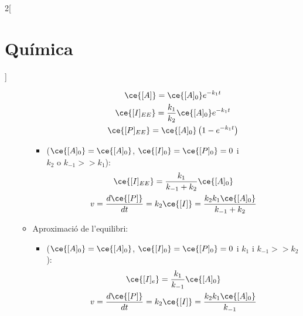 \documentclass[../../../main.tex]{subfiles}
\begin{document}
\begin{multicols}{2}[\section{Química}]
\begin{itemize}
\begin{itemize}
\begin{itemize}
\begin{gather*}
                \ce{[A]}=\ce{[A]_0}e^{-k_1t}\\
                \ce{[I]_{EE}}=\frac{k_1}{k_2}\ce{[A]_0}e^{-k_1t}\\
                \ce{[P]_{EE}}=\ce{[A]_0}\left(1-e^{-k_1t}\right)
            \end{gather*}
            \item {} ($\ce{[A]_0}=\ce{[A]_0}$, $\ce{[I]_0}=\ce{[P]_0}=0$ i $k_2\text{ o }k_{-1}>>k_1$):
            \begin{gather*}
                \ce{[I]_{EE}}=\frac{k_1}{k_{-1}+k_2}\ce{[A]_0}\\
                v=\frac{d\ce{[P]}}{dt}=k_2\ce{[I]}=\frac{k_2k_1\ce{[A]_0}}{k_{-1}+k_2}
            \end{gather*}
        \end{itemize}
        \item Aproximació de l'equilibri:
        \begin{itemize}
            \item {} ($\ce{[A]_0}=\ce{[A]_0}$, $\ce{[I]_0}=\ce{[P]_0}=0$ i $k_1$ i $k_{-1}>>k_2$):
            \begin{gather*}
                \ce{[I]_e}=\frac{k_1}{k_{-1}}\ce{[A]_0}\\
                v=\frac{d\ce{[P]}}{dt}=k_2\ce{[I]}=\frac{k_2k_1\ce{[A]_0}}{k_{-1}}
            \end{gather*}
        \end{itemize}
    \end{itemize}
\end{itemize}
\end{multicols}
\end{document}
